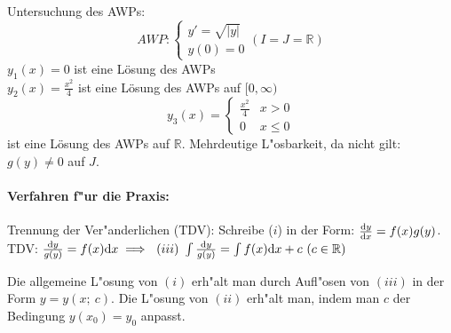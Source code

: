 \documentclass[a4paper,twoside,DIV15,BCOR12mm]{scrbook}
\begin{document}
\begin{beispiel}
Untersuchung des AWPs:
$$ AWP: \begin{cases}
y' = \sqrt{|y|} \\
y(0) = 0
\end{cases} (I = J = \mathbb{R})$$
$y_1(x) = 0$ ist eine Lösung des AWPs \\
$y_2(x) = \frac{x^2}{4}$ ist eine Lösung des AWPs auf $[0, \infty)$
$$ y_3(x) = 
\left\{ \begin{array}{ll}
\frac{x^2}{4} & x > 0 \\
0 & x \le 0
\end{array} \right. $$
ist eine Lösung des AWPs auf $\mathbb{R}$. Mehrdeutige L"osbarkeit, da nicht gilt: $g(y)\ne 0$ auf $J$.
\end{beispiel}

\paragraph{Verfahren f"ur die Praxis:} Trennung der Ver"anderlichen (TDV):
Schreibe ($i$) in der Form: $\frac{\mathrm{d} y}{\mathrm{d} x}=f(x)g(y)$. TDV:
$\frac{\mathrm{d} y}{g(y)}=f(x)\mathrm{d} x\implies \ (iii)\ \int\frac{\mathrm{d} y}{g(y)}=\int f(x)\mathrm{d} x + c\ (c\in\mathbb{R})$

Die allgemeine L"osung von $(i)$ erh"alt man durch Aufl"osen von $(iii)$ in der Form $y=y(x;\ c)$. Die L"osung
von $(ii)$ erh"alt man, indem man $c$ der Bedingung $y(x_0)=y_0$ anpasst.
\end{document}
